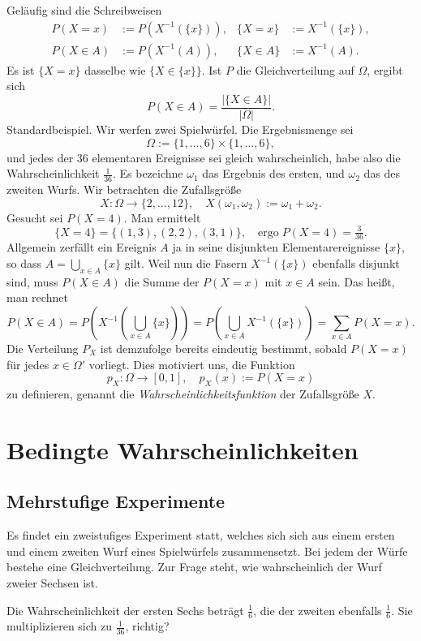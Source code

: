 Geläufig sind die Schreibweisen
\begin{align*}
P(X=x) &:= P(X^{-1}(\{x\})), & \{X=x\} &:= X^{-1}(\{x\}),\\
P(X\in A) &:= P(X^{-1}(A)), & \{X\in A\} &:= X^{-1}(A).
\end{align*}
Es ist $\{X=x\}$ dasselbe wie $\{X\in\{x\}\}$. 
Ist $P$ die Gleichverteilung auf $\Omega$, ergibt sich
\[P(X\in A) = \frac{|\{X\in A\}|}{|\Omega|}.\]
Standardbeispiel. Wir werfen zwei Spielwürfel.
Die Ergebnismenge sei%
\[\Omega := \{1,\ldots,6\}\times\{1,\ldots,6\},\]
und jedes der 36 elementaren Ereignisse sei gleich wahrscheinlich, habe
also die Wahrscheinlichkeit $\tfrac{1}{36}$.
Es bezeichne $\omega_1$ das Ergebnis des ersten, und $\omega_2$
das des zweiten Wurfs. Wir betrachten die Zufallsgröße%
\[X\colon\Omega\to\{2,\ldots,12\},\quad
X(\omega_1,\omega_2) := \omega_1+\omega_2.\]
Gesucht sei $P(X=4)$. Man ermittelt
\[\{X=4\} = \{(1,3), (2,2), (3,1)\},\quad\text{ergo}\;P(X=4) = \tfrac{3}{36}.\]
Allgemein zerfällt ein Ereignis $A$ ja in seine disjunkten Elementarereignisse
$\{x\}$, so dass $A = \bigcup_{x\in A} \{x\}$ gilt. Weil nun die
Fasern $X^{-1}(\{x\})$ ebenfalls disjunkt sind, muss $P(X\in A)$ die
Summe der $P(X=x)$ mit $x\in A$ sein. Das heißt, man rechnet%
\[P(X\in A) = P(X^{-1}(\bigcup_{x\in A} \{x\})) = P(\bigcup_{x\in A} X^{-1}(\{x\}))
= \sum_{x\in A} P(X=x).\]
Die Verteilung $P_X$ ist demzufolge bereits eindeutig bestimmt,
sobald $P(X=x)$ für jedes $x\in\Omega'$ vorliegt. Dies motiviert
uns, die Funktion
\[p_X\colon\Omega\to[0,1],\quad p_X(x) := P(X=x)\]
zu definieren, genannt die \emph{Wahrscheinlichkeitsfunktion} der
Zufallsgröße $X$.

\newpage
\section{Bedingte Wahrscheinlichkeiten}

\subsection{Mehrstufige Experimente}

Es findet ein zweistufiges Experiment statt, welches sich sich
aus einem ersten und einem zweiten Wurf eines Spielwürfels
zusammensetzt. Bei jedem der Würfe bestehe eine Gleichverteilung.
Zur Frage steht, wie wahrscheinlich der Wurf zweier Sechsen ist.

Die Wahrscheinlichkeit der ersten Sechs beträgt $\tfrac{1}{6}$,
die der zweiten ebenfalls $\tfrac{1}{6}$. Sie multiplizieren sich
zu $\tfrac{1}{36}$, richtig?

